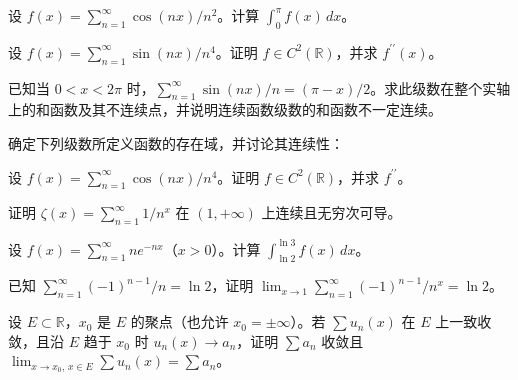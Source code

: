 \newpage
\noindent\begin{minipage}{\textwidth}
设 $f(x)=\sum_{n=1}^{\infty}\cos(nx)/n^2$。计算 $\int_0^\pi f(x)\,dx$。
\end{minipage}\par\vfill
\noindent\begin{minipage}{\textwidth}
设 $f(x)=\sum_{n=1}^{\infty}\sin(nx)/n^4$。证明 $f\in C^2(\mathbb R)$，并求 $f^{\prime\prime}(x)$。
\end{minipage}\par\vfill
\noindent\begin{minipage}{\textwidth}
已知当 $0<x<2\pi$ 时，$\sum_{n=1}^{\infty}\sin(nx)/n=(\pi-x)/2$。求此级数在整个实轴上的和函数及其不连续点，并说明连续函数级数的和函数不一定连续。
\end{minipage}\par\vfill
\newpage
\noindent\begin{minipage}{\textwidth}
确定下列级数所定义函数的存在域，并讨论其连续性：
\end{minipage}\par\vfill
\noindent\begin{minipage}{\textwidth}
设 $f(x)=\sum_{n=1}^{\infty}\cos(nx)/n^4$。证明 $f\in C^2(\mathbb R)$，并求 $f^{\prime\prime}$。
\end{minipage}\par\vfill
\noindent\begin{minipage}{\textwidth}
证明 $\zeta(x)=\sum_{n=1}^{\infty}1/n^x$ 在 $(1,+\infty)$ 上连续且无穷次可导。
\end{minipage}\par\vfill
\newpage
\noindent\begin{minipage}{\textwidth}
设 $f(x)=\sum_{n=1}^{\infty}ne^{-nx}$（$x>0$）。计算 $\int_{\ln2}^{\ln3}f(x)\,dx$。
\end{minipage}\par\vfill
\noindent\begin{minipage}{\textwidth}
已知 $\sum_{n=1}^{\infty}(-1)^{n-1}/n=\ln2$，证明 $\lim_{x\to1}\sum_{n=1}^{\infty}(-1)^{n-1}/n^x=\ln2$。
\end{minipage}\par\vfill
\noindent\begin{minipage}{\textwidth}
设 $E\subset\mathbb R$，$x_0$ 是 $E$ 的聚点（也允许 $x_0=\pm\infty$）。若 $\sum u_n(x)$ 在 $E$ 上一致收敛，且沿 $E$ 趋于 $x_0$ 时 $u_n(x)\to a_n$，证明 $\sum a_n$ 收敛且 $\lim_{x\to x_0,\,x\in E}\sum u_n(x)=\sum a_n$。
\end{minipage}\par\vfill

